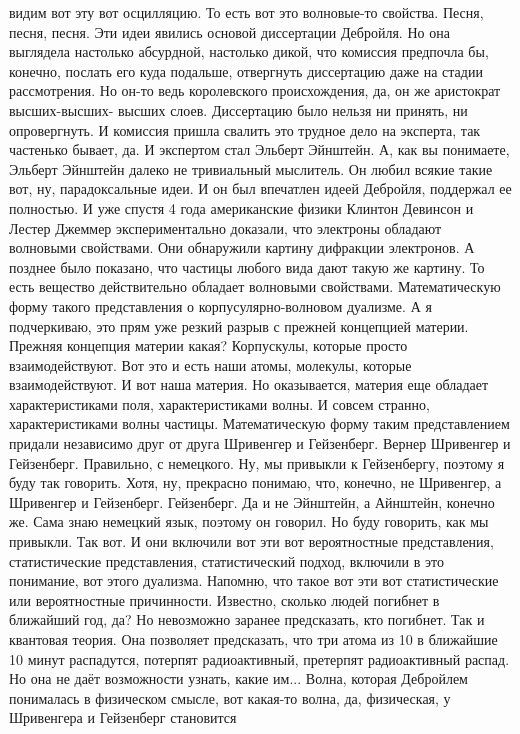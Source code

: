 видим вот эту вот осцилляцию. То есть вот это волновые-то свойства. Песня,
песня, песня. Эти идеи явились основой диссертации Дебройля. Но она выглядела
настолько абсурдной, настолько дикой, что комиссия предпочла бы, конечно,
послать его куда подальше, отвергнуть диссертацию даже на стадии рассмотрения.
Но он-то ведь королевского происхождения, да, он же аристократ высших-высших-
высших слоев. Диссертацию было нельзя ни принять, ни опровергнуть. И комиссия
пришла свалить это трудное дело на эксперта, так частенько бывает, да. И
экспертом стал Эльберт Эйнштейн. А, как вы понимаете, Эльберт Эйнштейн далеко не
тривиальный мыслитель. Он любил всякие такие вот, ну, парадоксальные идеи. И он
был впечатлен идеей Дебройля, поддержал ее полностью. И уже спустя 4 года
американские физики Клинтон Девинсон и Лестер Джеммер экспериментально доказали,
что электроны обладают волновыми свойствами. Они обнаружили картину дифракции
электронов. А позднее было показано, что частицы любого вида дают такую же
картину. То есть вещество действительно обладает волновыми свойствами.
Математическую форму такого представления о корпусулярно-волновом дуализме. А я
подчеркиваю, это прям уже резкий разрыв с прежней концепцией материи. Прежняя
концепция материи какая? Корпускулы, которые просто взаимодействуют. Вот это и
есть наши атомы, молекулы, которые взаимодействуют. И вот наша материя. Но
оказывается, материя еще обладает характеристиками поля, характеристиками волны.
И совсем странно, характеристиками волны частицы. Математическую форму таким
представлением придали независимо друг от друга Шривенгер и Гейзенберг. Вернер
Шривенгер и Гейзенберг. Правильно, с немецкого. Ну, мы привыкли к Гейзенбергу,
поэтому я буду так говорить. Хотя, ну, прекрасно понимаю, что, конечно, не
Шривенгер, а Шривенгер и Гейзенберг. Гейзенберг. Да и не Эйнштейн, а Айнштейн,
конечно же. Сама знаю немецкий язык, поэтому он говорил. Но буду говорить, как
мы привыкли. Так вот. И они включили вот эти вот вероятностные представления,
статистические представления, статистический подход, включили в это понимание,
вот этого дуализма. Напомню, что такое вот эти вот статистические или
вероятностные причинности. Известно, сколько людей погибнет в ближайший год, да?
Но невозможно заранее предсказать, кто погибнет. Так и квантовая теория. Она
позволяет предсказать, что три атома из 10 в ближайшие 10 минут распадутся,
потерпят радиоактивный, претерпят радиоактивный распад. Но она не даёт
возможности узнать, какие им... Волна, которая Дебройлем понималась в физическом
смысле, вот какая-то волна, да, физическая, у Шривенгера и Гейзенберг становится
